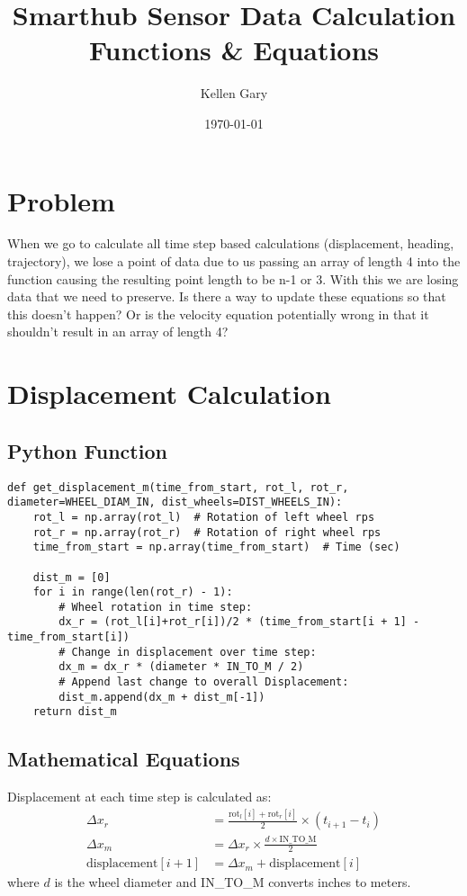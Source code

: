 \documentclass{article}
\title{Smarthub Sensor Data Calculation Functions \& Equations}
\author{Kellen Gary}
\date{\today}
\begin{document}
\maketitle

\section*{Problem}
When we go to calculate all time step based calculations (displacement, heading, trajectory), we lose a point of data due to us passing an array of length 4 into the function causing the resulting point length to be n-1 or 3. With this we are losing data that we need to preserve. Is there a way to update these equations so that this doesn't happen? Or is the velocity equation potentially wrong in that it shouldn't result in an array of length 4?

\section{Displacement Calculation}

\subsection{Python Function}
\begin{lstlisting}
def get_displacement_m(time_from_start, rot_l, rot_r, diameter=WHEEL_DIAM_IN, dist_wheels=DIST_WHEELS_IN):
    rot_l = np.array(rot_l)  # Rotation of left wheel rps
    rot_r = np.array(rot_r)  # Rotation of right wheel rps
    time_from_start = np.array(time_from_start)  # Time (sec)

    dist_m = [0]
    for i in range(len(rot_r) - 1):
        # Wheel rotation in time step:
        dx_r = (rot_l[i]+rot_r[i])/2 * (time_from_start[i + 1] - time_from_start[i])
        # Change in displacement over time step:
        dx_m = dx_r * (diameter * IN_TO_M / 2)
        # Append last change to overall Displacement:
        dist_m.append(dx_m + dist_m[-1])
    return dist_m
\end{lstlisting}

\subsection{Mathematical Equations}
Displacement at each time step is calculated as:
\begin{align*}
\Delta x_r &= \frac{\text{rot}_l[i] + \text{rot}_r[i]}{2} \times (t_{i+1} - t_i) \\
\Delta x_m &= \Delta x_r \times \frac{d \times \text{IN\_TO\_M}}{2} \\
\text{displacement}[i+1] &= \Delta x_m + \text{displacement}[i]
\end{align*}
where $d$ is the wheel diameter and IN\_TO\_M converts inches to meters.
\end{document}
